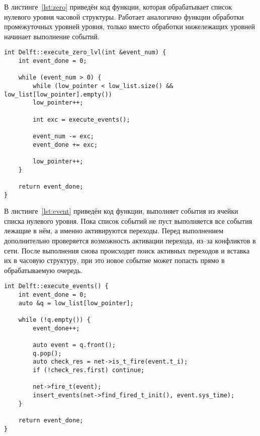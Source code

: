 В листинге~\ref{lst:zero} приведён код функции, которая обрабатывает список нулевого уровня часовой структуры. Работает аналогично функции обработки промежуточных уровней уровня, только вместо обработки нижележащих уровней начинает выполнение событий.

\begin{center}
	\captionsetup{justification=raggedright,singlelinecheck=off}
	\begin{lstlisting}[label=lst:zero,caption=Функция обработки нижнего списка,showstringspaces=false]
int Delft::execute_zero_lvl(int &event_num) {
	int event_done = 0;
	
	while (event_num > 0) {
		while (low_pointer < low_list.size() && low_list[low_pointer].empty())
		low_pointer++;
		
		int exc = execute_events();
		
		event_num -= exc;
		event_done += exc;
		
		low_pointer++;
	}
	
	return event_done;
}	
	\end{lstlisting}
\end{center}
\FloatBarrier

В листинге~\ref{lst:event} приведён код функции, выполняет события из ячейки списка нулевого уровня. Пока список событий не пуст выполняется все события лежащие в нём, а именно активируются переходы. Перед выполнением дополнительно проверяется возможность активации перехода, из--за конфликтов в сети. После выполнения снова происходит поиск активных переходов и вставка их в часовую структуру, при это новое событие может попасть прямо в обрабатываемую очередь.

\begin{center}
	\captionsetup{justification=raggedright,singlelinecheck=off}
	\begin{lstlisting}[label=lst:event,caption=Функция выполнения событий,showstringspaces=false]
int Delft::execute_events() {
	int event_done = 0;
	auto &q = low_list[low_pointer];
	
	while (!q.empty()) {
		event_done++;
		
		auto event = q.front();
		q.pop();
		auto check_res = net->is_t_fire(event.t_i);
		if (!check_res.first) continue;
		
		net->fire_t(event);
		insert_events(net->find_fired_t_init(), event.sys_time);
	}
	
	return event_done;
}
	\end{lstlisting}
\end{center}
\FloatBarrier


